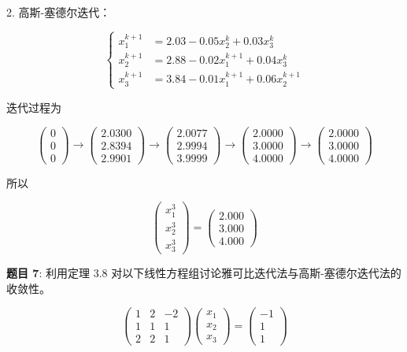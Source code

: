 \documentclass{article}
\begin{document}
2. 高斯-塞德尔迭代：

$$
\left\{
\begin{aligned}
    x_1^{k + 1} &= 2.03 - 0.05x_2^k + 0.03x_3^k \\
    x_2^{k + 1} &= 2.88 - 0.02x_1^{k + 1} + 0.04x_3^k \\
    x_3^{k + 1} &= 3.84 - 0.01x_1^{k + 1} + 0.06x_2^{k + 1}
\end{aligned}
\right.
$$

迭代过程为

$$
\begin{pmatrix}
    0 \\
    0 \\
    0
\end{pmatrix}
\longrightarrow
\begin{pmatrix}
    2.0300 \\
    2.8394 \\
    2.9901
\end{pmatrix}
\longrightarrow
\begin{pmatrix}
    2.0077 \\
    2.9994 \\
    3.9999
\end{pmatrix}
\longrightarrow
\begin{pmatrix}
    2.0000 \\
    3.0000 \\
    4.0000
\end{pmatrix}
\longrightarrow
\begin{pmatrix}
    2.0000 \\
    3.0000 \\
    4.0000
\end{pmatrix}
$$

所以

$$
\begin{pmatrix}
    x_1^3 \\
    x_2^3 \\
    x_3^3
\end{pmatrix}
=
\begin{pmatrix}
    2.000 \\
    3.000 \\
    4.000
\end{pmatrix}
$$

\noindent\textbf{题目 7}: 利用定理 3.8 对以下线性方程组讨论雅可比迭代法与高斯-塞德尔迭代法的收敛性。

$$
\begin{pmatrix}
    1 & 2 & -2 \\
    1 & 1 & 1 \\
    2 & 2 & 1
\end{pmatrix}
\begin{pmatrix}
    x_1 \\
    x_2 \\
    x_3
\end{pmatrix}
=
\begin{pmatrix}
    -1 \\
    1 \\
    1
\end{pmatrix}
$$
\end{document}
